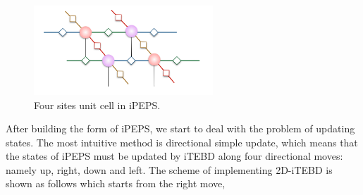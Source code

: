 \begin{figure}[ht]
	\centering
	\includegraphics[width=0.6\textwidth]{figures/fig314.png}
	\caption[The tensor diagrams of 2-D lattice]{Four sites unit cell in iPEPS.}
	\label{fig315}
\end{figure}

After building the form of iPEPS, we start to deal with the problem of updating states. The most intuitive method is directional simple update, which means that the states of iPEPS must be updated by iTEBD along four directional moves: namely up, right, down and left. The scheme of implementing 2D-iTEBD is shown as follows which starts from the right move,

